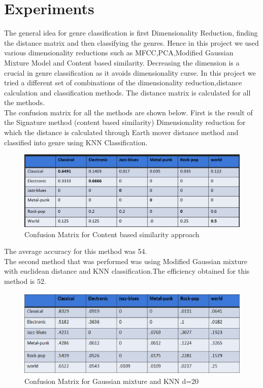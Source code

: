 \documentclass[12pt]{article}
\begin{document}
\section{Experiments}\label{sec:exp}
The general idea for genre classification is first Dimensionality Reduction, finding the distance matrix and then classifying the genres.
Hence in this project we used various dimensionality reductions such as MFCC,PCA,Modified Gaussian Mixture Model and Content based similarity. Decreasing the dimension is a crucial in genre classification as it avoids dimensionality curse.
In this project we tried a different set of combinations of the dimensionality reduction,distance calculation and classification methods.
The distance matrix is calculated for all the methods.\\
The confusion matrix for all the methods are shown below. First is the result of the Signature method (content based similarity) Dimensionality reduction for which the distance is calculated through Earth mover distance method and classified into genre using KNN Classification.
\begin{figure}[H]
\center
\includegraphics [scale=0.35]{results1.png}
\caption{Confusion Matrix for Content based similarity approach}
\end{figure}
The average accuracy for this method was 54. \\
The second method that was performed was using Modified Gaussian mixture with euclidean distance and KNN classification.The efficiency obtained for this method is $52$.
\begin{figure}[H]
\center
\includegraphics [scale=0.65]{result2.png}
\caption{Confusion Matrix for Gaussian mixture and KNN d=20 }
\end{figure}
\end{document}
